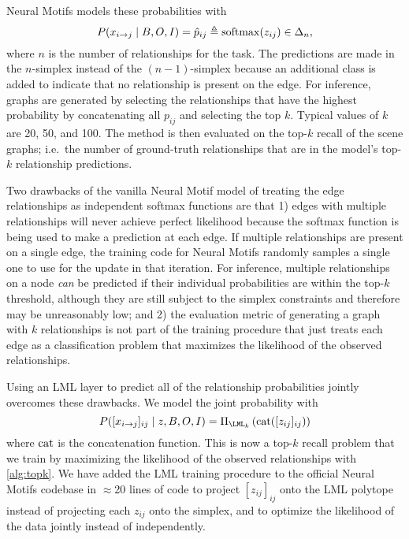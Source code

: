 Neural Motifs models these probabilities with
\begin{equation}
  \label{eq:sg:vanilla}
  P(x_{i \to j} \mid B, O, I) =
  \hat p_{ij} \triangleq {\rm softmax}(z_{ij}) \in\Delta_n,
\end{equation}
where $n$ is the number of relationships for the task.
The predictions are made in the $n$-simplex instead
of the $(n-1)$-simplex because an additional class
is added to indicate that no relationship is present
on the edge.
For inference, graphs are generated by selecting
the relationships that have the highest probability by
concatenating all $p_{ij}$ and selecting the top $k$.
Typical values of $k$ are 20, 50, and 100.
The method is then evaluated on the top-$k$ recall
of the scene graphs; i.e.~the number of ground-truth
relationships that are in the model's top-$k$
relationship predictions.

Two drawbacks of the vanilla Neural Motif model of treating
the edge relationships as independent softmax functions
are that
1) edges with multiple relationships will never
achieve perfect likelihood because the softmax function
is being used to make a prediction at each edge.
If multiple relationships are present on a single edge,
the training code for Neural Motifs randomly
samples a single one to use for the update in that iteration.
For inference, multiple relationships on a node
\emph{can} be predicted if their individual probabilities
are within the top-$k$ threshold, although they are
still subject to the simplex constraints and therefore
may be unreasonably low; and
2) the evaluation metric of generating a graph
with $k$ relationships is not part of the training
procedure that just treats each edge as a classification
problem that maximizes the likelihood of the observed
relationships.

Using an LML layer to predict all of the relationship
probabilities jointly overcomes these drawbacks.
We model the joint probability with
\begin{equation}
  \label{eq:sg:lml}
  P([x_{i \to j}]_{ij} \mid z, B, O, I) = \Pi_{\LML_k}\left({\rm cat}([z_{ij}]_{ij})\right)
\end{equation}
where ${\rm cat}$ is the concatenation function.
This is now a top-$k$ recall problem that we train by
maximizing the likelihood of the observed relationships
with \cref{alg:topk}.
We have added the LML training procedure to the official
Neural Motifs codebase in $\approx$20 lines of code to
project $[z_{ij}]_{ij}$ onto the LML polytope instead
of projecting each $z_{ij}$ onto the simplex, and
to optimize the likelihood of the data jointly
instead of independently.

